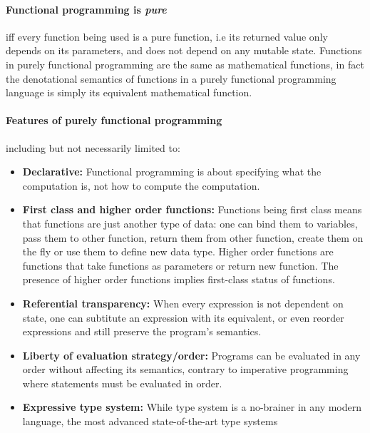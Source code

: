 \documentclass[../gr-final.tex]{subfiles}
\begin{document}
\paragraph {Functional programming is {\it{\bfseries pure}}}iff every function being used is a pure function, i.e
its returned value only depends on its parameters, and does not
depend on any mutable state. Functions in purely functional
programming are the same as mathematical functions, in fact the
denotational semantics of functions in a purely functional
programming language is simply its equivalent mathematical function.
\paragraph {Features of purely functional programming}including but not
necessarily limited to:
\begin{itemize}
       \item {\bfseries Declarative: } Functional programming is
               about specifying what the computation is, not how
               to compute the computation.
       \item {\bfseries First class and higher order functions: }
               Functions being first class means that functions
               are just another type of data: one can bind them
               to variables, pass them to other function,
               return them from other function, create them on
               the fly or use them to
               define new data type. Higher order functions are
               functions that take functions as parameters or
               return new function. The presence of higher order 
               functions implies first-class status of functions.
       \item {\bfseries Referential transparency: } When every
               expression is not dependent on state, one can
               subtitute an expression with its equivalent, or
               even reorder expressions and still preserve the
               program's semantics.
       \item {\bfseries Liberty of evaluation strategy/order: }
               Programs can be evaluated in any order without
               affecting its semantics, contrary to imperative
               programming where statements must be evaluated in
               order. 
       \item {\bfseries Expressive type system: } While type
               system is a no-brainer in any modern language,
               the most advanced state-of-the-art type systems

\end{itemize}
\end{document}

